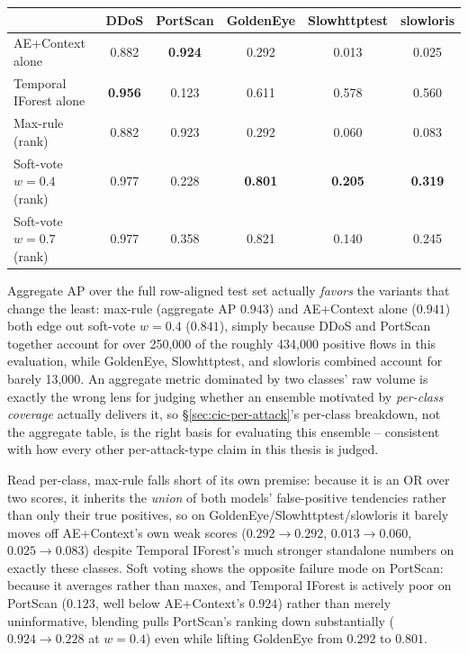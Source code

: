 \begin{center}
\begin{tabular}{@{}lccccc@{}}
\toprule
 & DDoS & PortScan & GoldenEye & Slowhttptest & slowloris \\
\midrule
AE+Context alone        & 0.882 & \textbf{0.924} & 0.292 & 0.013 & 0.025 \\
Temporal IForest alone  & \textbf{0.956} & 0.123 & 0.611 & 0.578 & 0.560 \\
Max-rule (rank)         & 0.882 & 0.923 & 0.292 & 0.060 & 0.083 \\
Soft-vote $w=0.4$ (rank) & 0.977 & 0.228 & \textbf{0.801} & \textbf{0.205} & \textbf{0.319} \\
Soft-vote $w=0.7$ (rank) & 0.977 & 0.358 & 0.821 & 0.140 & 0.245 \\
\bottomrule
\end{tabular}
\end{center}

Aggregate AP over the full row-aligned test set actually \emph{favors} the variants that change the least: max-rule (aggregate AP $0.943$) and AE+Context alone ($0.941$) both edge out soft-vote $w=0.4$ ($0.841$), simply because DDoS and PortScan together account for over 250{,}000 of the roughly 434{,}000 positive flows in this evaluation, while GoldenEye, Slowhttptest, and slowloris combined account for barely 13{,}000. An aggregate metric dominated by two classes' raw volume is exactly the wrong lens for judging whether an ensemble motivated by \emph{per-class coverage} actually delivers it, so \S\ref{sec:cic-per-attack}'s per-class breakdown, not the aggregate table, is the right basis for evaluating this ensemble -- consistent with how every other per-attack-type claim in this thesis is judged.

Read per-class, max-rule falls short of its own premise: because it is an OR over two scores, it inherits the \emph{union} of both models' false-positive tendencies rather than only their true positives, so on GoldenEye/Slowhttptest/slowloris it barely moves off AE+Context's own weak scores ($0.292 \to 0.292$, $0.013 \to 0.060$, $0.025 \to 0.083$) despite Temporal IForest's much stronger standalone numbers on exactly these classes. Soft voting shows the opposite failure mode on PortScan: because it averages rather than maxes, and Temporal IForest is actively poor on PortScan ($0.123$, well below AE+Context's $0.924$) rather than merely uninformative, blending pulls PortScan's ranking down substantially ($0.924 \to 0.228$ at $w=0.4$) even while lifting GoldenEye from $0.292$ to $0.801$.

